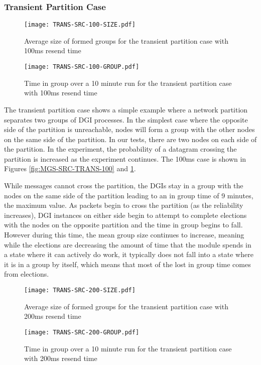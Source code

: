 \subsubsection{Transient Partition Case}

\begin{figure}
\centering
\begin{minipage}{0.45\textwidth}
    \centering
    \texttt{[image: TRANS-SRC-100-SIZE.pdf]}
    \caption{Average size of formed groups for the transient partition case with 100ms resend time}
    \label{fig:MGS-SRC-TRANS-100}
\end{minipage}%
\qquad
\begin{minipage}{0.45\textwidth}
    \centering
    \texttt{[image: TRANS-SRC-100-GROUP.pdf]}
    \caption{Time in group over a 10 minute run for the transient partition case with 100ms resend time}
    \label{fig:IGT-SRC-TRANS-100}
\end{minipage}
\end{figure}

The transient partition case shows a simple example where a network partition
separates two groups of DGI processes. In the simplest case where the opposite side of
the partition is unreachable, nodes will form a group with the other nodes on the
same side of the partition. In our tests, there are two nodes on each side of
the partition. In the experiment, the probability of a datagram crossing the
partition is increased as the experiment continues. The 100ms case is shown in
Figures \ref{fig:MGS-SRC-TRANS-100} and \ref{fig:IGT-SRC-TRANS-100}.

While messages cannot cross the partition, the DGIs stay in a group with the
nodes on the same side of the partition leading to an in group time of 9 minutes,
the maximum value. As packets begin to cross the partition (as the reliability
increases), DGI instances on either side begin to attempt to complete elections
with the nodes on the opposite partition and the time in group begins to fall.
However during this time, the mean group size continues to increase, meaning
while the elections are decreasing the amount of time that the module spends in a
state where it can actively do work, it typically does not fall into a state
where it is in a group by itself, which means that most of the lost in group
time comes from elections.

\begin{figure}
\centering
\begin{minipage}{0.45\textwidth}
    \centering
    \texttt{[image: TRANS-SRC-200-SIZE.pdf]}
    \caption{Average size of formed groups for the transient partition case with 200ms resend time}
    \label{fig:MGS-SRC-TRANS-200}
\end{minipage}%
\qquad
\begin{minipage}{0.45\textwidth}
    \centering
    \texttt{[image: TRANS-SRC-200-GROUP.pdf]}
    \caption{Time in group over a 10 minute run for the transient partition case with 200ms resend time}
    \label{fig:IGT-SRC-TRANS-200}
\end{minipage}
\end{figure}

